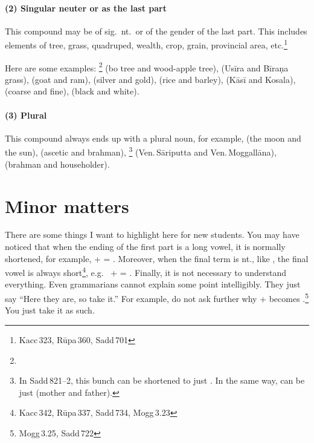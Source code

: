 \paragraph*{(2) Singular neuter or as the last part} This compound may be of sig.\ nt.\ or of the gender of the last part. This includes elements of tree, grass, quadruped, wealth, crop, grain, provincial area, etc.\footnote{Kacc\,323, R\=upa\,360, Sadd\,701} 

Here are some examples: \footnote{} (bo tree and wood-apple tree),  (Us\=ira and B\=ira\d na grass),  (goat and ram),  (silver and gold),  (rice and barley),  (K\=as\=i and Kosala),  (coarse and fine),  (black and white).

\paragraph*{(3) Plural} This compound always ends up with a plural noun, for example,  (the moon and the sun),  (ascetic and brahman), \footnote{In Sadd\,821--2, this bunch can be shortened to just . In the same way,  can be just  (mother and father).} (Ven.\,S\=arip\-utta and Ven.\,Moggall\=ana),  (brahman and householder).

\section*{Minor matters}

There are some things I want to highlight here for new students. You may have noticed that when the ending of the first part is a long vowel, it is normally shortened, for example,  +  = . Moreover, when the final term is nt., like , the final vowel is always short\footnote{Kacc\,342, R\=upa\,337, Sadd\,734, Mogg\,3.23}, e.g.\  +  = . Finally, it is not necessary to understand everything. Even grammarians cannot explain some point intelligibly. They just say ``Here they are, so take it.'' For example, do not ask further why  +  becomes .\footnote{Mogg\,3.25, Sadd\,722} You just take it as such.

